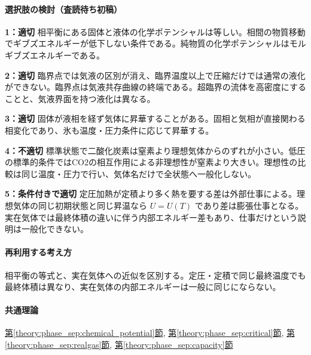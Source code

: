 \paragraph{選択肢の検討（査読待ち初稿）}\mbox{}\par

\noindent\textbf{1：適切} 相平衡にある固体と液体の化学ポテンシャルは等しい。相間の物質移動でギブズエネルギーが低下しない条件である。純物質の化学ポテンシャルはモルギブズエネルギーである。\par

\noindent\textbf{2：適切} 臨界点では気液の区別が消え、臨界温度以上で圧縮だけでは通常の液化ができない。臨界点は気液共存曲線の終端である。超臨界の流体を高密度にすることと、気液界面を持つ液化は異なる。\par

\noindent\textbf{3：適切} 固体が液相を経ず気体に昇華することがある。固相と気相が直接関わる相変化であり、氷も温度・圧力条件に応じて昇華する。\par

\noindent\textbf{4：不適切} 標準状態で二酸化炭素は窒素より理想気体からのずれが小さい。低圧の標準的条件ではCO2の相互作用による非理想性が窒素より大きい。理想性の比較は同じ温度・圧力で行い、気体名だけで全状態へ一般化しない。\par

\noindent\textbf{5：条件付きで適切} 定圧加熱が定積より多く熱を要する差は外部仕事による。理想気体の同じ初期状態と同じ昇温なら \(U=U(T)\) であり差は膨張仕事となる。実在気体では最終体積の違いに伴う内部エネルギー差もあり、仕事だけという説明は一般化できない。\par

\paragraph{再利用する考え方} 相平衡の等式と、実在気体への近似を区別する。定圧・定積で同じ最終温度でも最終体積は異なり、実在気体の内部エネルギーは一般に同じにならない。

\paragraph{共通理論} \hyperref[theory:phase_sep:chemical_potential]{第\ref*{theory:phase_sep:chemical_potential}節}, \hyperref[theory:phase_sep:critical]{第\ref*{theory:phase_sep:critical}節}, \hyperref[theory:phase_sep:realgas]{第\ref*{theory:phase_sep:realgas}節}, \hyperref[theory:phase_sep:capacity]{第\ref*{theory:phase_sep:capacity}節}

